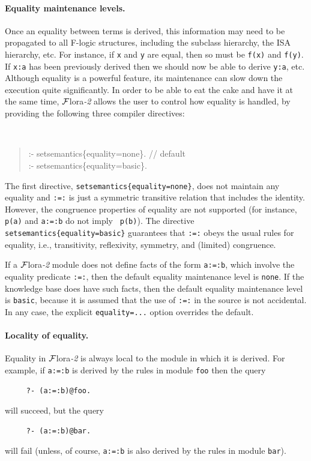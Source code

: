 \documentclass[11pt]{article}
\newcommand{\FLORA}{{\mbox{\sc ${\cal F}${lora}\rm\emph{-2}}}\xspace}
\newcommand{\FLSYSTEM}{\FLORA}
\newcommand{\fl}{\mbox{F-logic}\xspace}
\begin{document}
\paragraph{Equality maintenance levels.}
Once an equality between terms is derived, this information may need to be
propagated to all \fl 
structures, including the subclass hierarchy, the ISA hierarchy, etc.
For instance, if {\tt x} and {\tt y} are equal, then so must be {\tt f(x)}
and {\tt f(y)}. If {\tt x:a} has been previously derived then we should now
be able to derive {\tt y:a}, etc. Although equality is a powerful
feature, its maintenance can slow down the execution quite significantly.
In order to be able to eat the cake and have it at the same time, \FLSYSTEM
allows the user to control how equality is handled,
by providing the following three compiler directives:
{\tt
\begin{quote}
:- setsemantics\{equality=none\}.  // default\\
:- setsemantics\{equality=basic\}.
\end{quote}
}

\noindent
The first directive, \mbox{\tt setsemantics\{equality=none\}}, does not
maintain any equality and {\tt :=:} is just a symmetric transitive relation
that includes the identity. However,
the congruence properties of equality are not
supported (for instance, {\tt p(a)} and {\tt a:=:b} do not imply {\tt
  p(b)}). The directive
\mbox{\tt setsemantics\{equality=basic\}} guarantees that {\tt :=:} obeys the
usual rules for equality, i.e., transitivity, reflexivity,
symmetry, and (limited) congruence.

If a \FLSYSTEM module does not define facts of the form {\tt a:=:b}, which
involve the equality predicate {\tt :=:}, then the default equality
maintenance level is {\tt none}. If the knowledge base does have such facts,
then the default equality maintenance level is {\tt basic}, because it is
assumed that the use of {\tt :=:} in the source is not accidental.
In any case, the explicit {\tt equality=...} option overrides the default.

\paragraph{Locality of equality.}
Equality in \FLSYSTEM is always local to the module in which it is derived.
For example, if {\tt a:=:b} is derived by the rules in module {\tt foo}
then the query
\begin{verbatim}
     ?- (a:=:b)@foo.  
\end{verbatim}
will succeed, but the query
\begin{verbatim}
     ?- (a:=:b)@bar.  
\end{verbatim}
will fail (unless, of course, {\tt a:=:b} is also derived by the rules in
module {\tt bar}).
\end{document}
